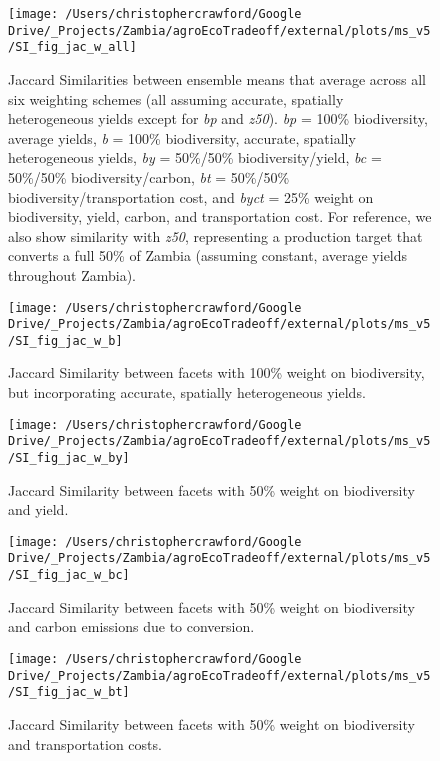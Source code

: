 \documentclass[
]{article}
\begin{document}
\begin{figure}
\texttt{[image: /Users/christophercrawford/Google Drive/\_Projects/Zambia/agroEcoTradeoff/external/plots/ms\_v5/SI\_fig\_jac\_w\_all]} \caption{Jaccard Similarities between ensemble means that average across all six weighting schemes (all assuming accurate, spatially heterogeneous yields except for \emph{bp} and \emph{z50}). \emph{bp} = 100\% biodiversity, average yields, \emph{b} = 100\% biodiversity, accurate, spatially heterogeneous yields, \emph{by} = 50\%/50\% biodiversity/yield, \emph{bc} = 50\%/50\% biodiversity/carbon, \emph{bt} = 50\%/50\% biodiversity/transportation cost, and \emph{byct} = 25\% weight on biodiversity, yield, carbon, and transportation cost. For reference, we also show similarity with \emph{z50}, representing a production target that converts a full 50\% of Zambia (assuming constant, average yields throughout Zambia).}\label{fig:jac-w-all}
\end{figure}

\begin{figure}
\texttt{[image: /Users/christophercrawford/Google Drive/\_Projects/Zambia/agroEcoTradeoff/external/plots/ms\_v5/SI\_fig\_jac\_w\_b]} \caption{Jaccard Similarity between facets with 100\% weight on biodiversity, but incorporating accurate, spatially heterogeneous yields.}\label{fig:jac-w-b}
\end{figure}

\begin{figure}
\texttt{[image: /Users/christophercrawford/Google Drive/\_Projects/Zambia/agroEcoTradeoff/external/plots/ms\_v5/SI\_fig\_jac\_w\_by]} \caption{Jaccard Similarity between facets with 50\% weight on biodiversity and yield.}\label{fig:jac-w-by}
\end{figure}

\begin{figure}
\texttt{[image: /Users/christophercrawford/Google Drive/\_Projects/Zambia/agroEcoTradeoff/external/plots/ms\_v5/SI\_fig\_jac\_w\_bc]} \caption{Jaccard Similarity between facets with 50\% weight on biodiversity and carbon emissions due to conversion.}\label{fig:jac-w-bc}
\end{figure}

\begin{figure}
\texttt{[image: /Users/christophercrawford/Google Drive/\_Projects/Zambia/agroEcoTradeoff/external/plots/ms\_v5/SI\_fig\_jac\_w\_bt]} \caption{Jaccard Similarity between facets with 50\% weight on biodiversity and transportation costs.}\label{fig:jac-w-bt}
\end{figure}
\end{document}
